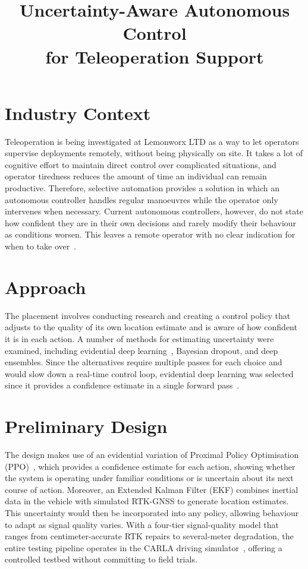 \documentclass[10pt,a4paper]{article}
\title{\vspace{-1.2em}\Large\bfseries Uncertainty-Aware Autonomous Control\\for Teleoperation Support}
\author{}
\date{\vspace{-3em}}
\begin{document}
\maketitle
\thispagestyle{fancy}


\section{Industry Context}
Teleoperation is being investigated at Lemonworx LTD as a way to let operators supervise deployments remotely, without being physically on site. It takes a lot of cognitive effort to maintain direct control over complicated situations, and operator tiredness reduces the amount of time an individual can remain productive. Therefore, selective automation provides a solution in which an autonomous controller handles regular manoeuvres while the operator only intervenes when necessary. Current autonomous controllers, however, do not state how confident they are in their own decisions and rarely modify their behaviour as conditions worsen. This leaves a remote operator with no clear indication for when to take over~\cite{yurtsever2020survey}.


\section{Approach}
The placement involves conducting research and creating a control policy that adjusts to the quality of its own location estimate and is aware of how confident it is in each action. A number of methods for estimating uncertainty were examined, including evidential deep learning~\cite{amini2020deep}, Bayesian dropout, and deep ensembles. Since the alternatives require multiple passes for each choice and would slow down a real-time control loop, evidential deep learning was selected since it provides a confidence estimate in a single forward pass~\cite{kendall2017uncertainties}.


\section{Preliminary Design}
The design makes use of an evidential variation of Proximal Policy Optimisation (PPO)~\cite{akgul2025eppo}, which provides a confidence estimate for each action, showing whether the system is operating under familiar conditions or is uncertain about its next course of action. Moreover, an Extended Kalman Filter (EKF) combines inertial data in the vehicle with simulated RTK-GNSS to generate location estimates. This uncertainty would then be incorporated into any policy, allowing behaviour to adapt as signal quality varies. With a four-tier signal-quality model that ranges from centimeter-accurate RTK repairs to several-meter degradation, the entire testing pipeline operates in the CARLA driving simulator~\cite{dosovitskiy2017carla}, offering a controlled testbed without committing to field trials.
\end{document}
